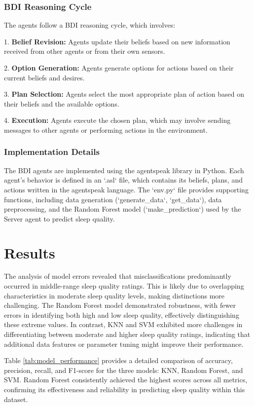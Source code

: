 \documentclass[conference]{IEEEtran}
\begin{document}
\subsubsection{BDI Reasoning Cycle}

The agents follow a BDI reasoning cycle, which involves:

1. \textbf{Belief Revision:} Agents update their beliefs based on new information received from other agents or from their own sensors.

2. \textbf{Option Generation:} Agents generate options for actions based on their current beliefs and desires.

3. \textbf{Plan Selection:} Agents select the most appropriate plan of action based on their beliefs and the available options.

4. \textbf{Execution:} Agents execute the chosen plan, which may involve sending messages to other agents or performing actions in the environment.

\subsubsection{Implementation Details}

The BDI agents are implemented using the agentspeak library in Python. Each agent's behavior is defined in an `.asl` file, which contains its beliefs, plans, and actions written in the agentspeak language. The `env.py` file provides supporting functions, including data generation (`generate\_data`, `get\_data`), data preprocessing, and the Random Forest model (`make\_prediction`) used by the Server agent to predict sleep quality.

\section{Results}
The analysis of model errors revealed that misclassifications predominantly occurred in middle-range sleep quality ratings. This is likely due to overlapping characteristics in moderate sleep quality levels, making distinctions more challenging. The Random Forest model demonstrated robustness, with fewer errors in identifying both high and low sleep quality, effectively distinguishing these extreme values. In contrast, KNN and SVM exhibited more challenges in differentiating between moderate and higher sleep quality ratings, indicating that additional data features or parameter tuning might improve their performance.

Table \ref{tab:model_performance} provides a detailed comparison of accuracy, precision, recall, and F1-score for the three models: KNN, Random Forest, and SVM. Random Forest consistently achieved the highest scores across all metrics, confirming its effectiveness and reliability in predicting sleep quality within this dataset.
\end{document}
